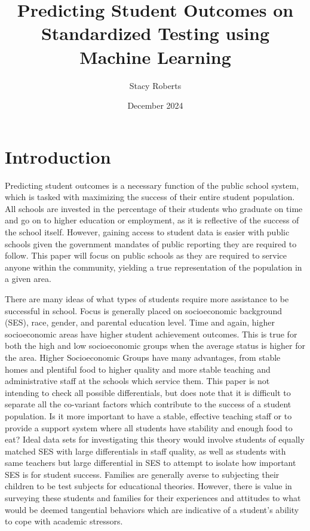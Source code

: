 \documentclass[doc]{apa6} %
\date{December 2024}
\title{Predicting Student Outcomes on Standardized Testing using Machine Learning}
\author{Stacy Roberts}
\affiliation{The University of Texas at Austin}
\begin{document}
\maketitle

\section{Introduction}

Predicting student outcomes is a necessary function of the public school system, which is tasked with maximizing the success of their entire student population. All schools are invested in the percentage of their students who graduate on time and go on to higher education or employment, as it is reflective of the success of the school itself. However, gaining access to student data is easier with public schools given the government mandates of public reporting they are required to follow. \cite{ecsa} This paper will focus on public schools as they are required to service anyone within the community, yielding a true representation of the population in a given area.

There are many ideas of what types of students require more assistance to be successful in school. Focus is generally placed on socioeconomic background (SES), race, gender, and parental education level. \cite{Bradley2022SESgap}  Time and again, higher socioeconomic areas have higher student achievement outcomes. This is true for both the high and low socioeconomic groups when the average status is higher for the area.  Higher Socioeconomic Groups have many advantages, from stable homes and plentiful food to higher quality and more stable teaching and administrative staff at the schools which service them. \cite{HSEffectsLongTerm} This paper is not intending to check all possible differentials, but does note that it is difficult to separate all the co-variant factors which contribute to the success of a student population. Is it more important to have a stable, effective teaching staff or to provide a support system where all students have stability and enough food to eat? Ideal data sets for investigating this theory would involve students of equally matched SES with large differentials in staff quality, as well as students with same teachers but large differential in SES to attempt to isolate how important SES is for student success. Families are generally averse to subjecting their children to be test subjects for educational theories. However, there is value in surveying these students and families for their experiences and attitudes to what would be deemed tangential behaviors which are indicative of a student's ability to cope with academic stressors. \cite{tiertaryBehaviors}
\end{document}
